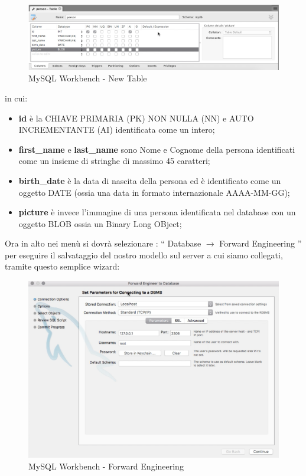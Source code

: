 \begin{center}
\begin{figure}[H]
\centering
\includegraphics[scale=0.8]{figures/mySQL_workbench_newtable.png}
\caption{MySQL Workbench - New Table}
\end{figure}
\end{center}

in cui:

\begin{itemize}

\item{\textbf{id}} è la CHIAVE PRIMARIA (PK) NON NULLA (NN) e AUTO INCREMENTANTE (AI) identificata come un intero;
\item{\textbf{first\_name} e \textbf{last\_name}} sono Nome e Cognome della persona identificati come un insieme di stringhe di massimo 45 caratteri;
\item{\textbf{birth\_date}} è la data di nascita della persona ed è identificato come un oggetto DATE (ossia una data in formato internazionale AAAA-MM-GG);
\item{\textbf{picture}} è invece l’immagine di una persona identificata nel database con un oggetto BLOB ossia un Binary Long OBject;

\end{itemize}

Ora in alto nei menù si dovrà selezionare : “ Database $\rightarrow$ Forward Engineering ” per eseguire il salvataggio del nostro modello sul server a cui siamo collegati, tramite questo semplice wizard: 

\begin{center}
\begin{figure}[H]
\centering
\includegraphics[scale=1]{figures/mySQL_workbench_FE.png}
\caption{MySQL Workbench - Forward Engineering}
\end{figure}
\end{center}

